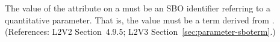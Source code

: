 The value of the  attribute on a \Parameter must be an SBO
identifier referring to a quantitative parameter.  That is, the value must
be a term derived from \sboparameter.  (References: L2V2 Section~4.9.5; L2V3
Section~\ref{sec:parameter-sboterm}.)
